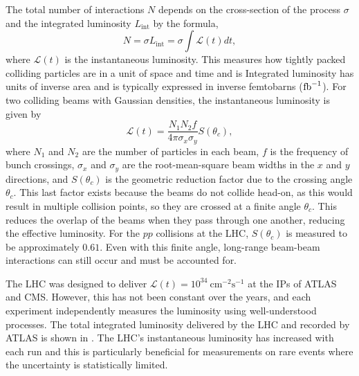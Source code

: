 The total number of interactions $N$ depends on the cross-section of the process $\sigma$ and the integrated luminosity $L_{\text{int}}$ by the formula,
\begin{equation}
    N = \sigma L_{\text{int}} = \sigma \int \mathcal{L}(t) dt,
\end{equation}
where $\mathcal{L}(t)$ is the instantaneous luminosity.
This measures how tightly packed colliding particles are in a unit of space and time and is
Integrated luminosity has units of inverse area and is typically expressed in inverse femtobarns ($\ifb$).
For two colliding beams with Gaussian densities, the instantaneous luminosity is given by
\begin{equation}
    \mathcal{L}(t) = \frac{N_1 N_2 f}{4 \pi \sigma_x \sigma_y} S(\theta_c),
\end{equation}
where $N_1$ and $N_2$ are the number of particles in each beam, $f$ is the frequency of bunch crossings, $\sigma_x$ and $\sigma_y$ are the root-mean-square beam widths in the $x$ and $y$ directions, and $S(\theta_c)$ is the geometric reduction factor due to the crossing angle $\theta_c$.
This last factor exists because the beams do not collide head-on, as this would result in multiple collision points, so they are crossed at a finite angle $\theta_c$.
This reduces the overlap of the beams when they pass through one another, reducing the effective luminosity.
For the $pp$ collisions at the LHC, $S(\theta_c)$ is measured to be approximately $0.61$.
Even with this finite angle, long-range beam-beam interactions can still occur and must be accounted for.

The LHC was designed to deliver $\mathcal{L}(t) = 10^{34}~\unit{\centi\meter^{-2}\second^{-1}}$ at the IPs of ATLAS and CMS.
However, this has not been constant over the years, and each experiment independently measures the luminosity using well-understood processes.
The total integrated luminosity delivered by the LHC and recorded by ATLAS is shown in .
The LHC's instantaneous luminosity has increased with each run and this is particularly beneficial for measurements on rare events where the uncertainty is statistically limited.

